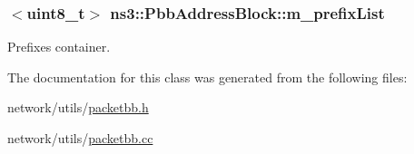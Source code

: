 \subsubsection[{\texorpdfstring{m\+\_\+prefix\+List}{m_prefixList}}]{$<$uint8\+\_\+t$>$ ns3\+::\+Pbb\+Address\+Block\+::m\+\_\+prefix\+List\hspace{0.3cm}{\ttfamily [private]}}\hypertarget{classns3_1_1PbbAddressBlock_a8af9b3c3361ad6f708bf9afae1fc2969}{}\label{classns3_1_1PbbAddressBlock_a8af9b3c3361ad6f708bf9afae1fc2969}


Prefixes container. 



The documentation for this class was generated from the following files\+:\begin{DoxyCompactItemize}
\item 
network/utils/\hyperlink{packetbb_8h}{packetbb.\+h}\item 
network/utils/\hyperlink{packetbb_8cc}{packetbb.\+cc}\end{DoxyCompactItemize}
